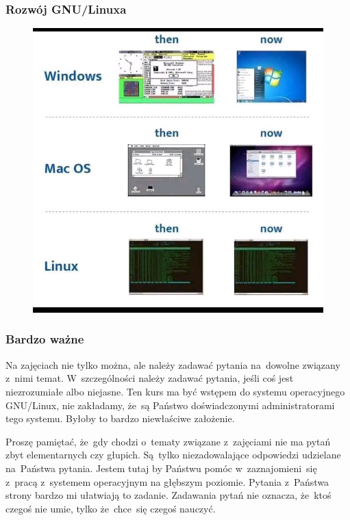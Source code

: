 \documentclass[10pt,t]{beamer}
\begin{document}
\begin{frame}
  \frametitle{Rozwój GNU/Linuxa}

  \vspace{-0.5em}


  \begin{figure}

    \label{fig:Evolution-of-OS}

    \centering


    \includegraphics[scale=0.3]
    {./Presentations-pictures/Miscancellous-pictures/Evolution-of-operating-systems.jpg}

  \end{figure}

\end{frame}





\begin{frame}
  \frametitle{Bardzo ważne}


  Na zajęciach nie tylko można, ale \alert{należy} zadawać pytania
  na~dowolne związany z~nimi temat. W~szczególności \alert{należy} zadawać
  pytania, jeśli coś jest niezrozumiałe albo niejasne. Ten kurs ma być
  wstępem do systemu operacyjnego GNU/Linux, \alert{nie} zakładamy, że~są
  Państwo doświadczonymi administratorami tego systemu. Byłoby to bardzo
  niewłaściwe założenie.

  Proszę pamiętać, że~gdy chodzi o~tematy związane z~zajęciami \alert{nie}
  ma pytań zbyt elementarnych czy głupich. Są~tylko niezadowalające
  odpowiedzi udzielane na~Państwa pytania. Jestem tutaj by Państwu pomóc
  w~zaznajomieni~się z~pracą z~systemem operacyjnym na głębszym poziomie.
  Pytania z~Państwa strony bardzo mi ułatwiają to zadanie. Zadawania pytań
  nie oznacza, że~ktoś czegoś nie umie, tylko że~chce~się czegoś nauczyć.

\end{frame}
\end{document}
